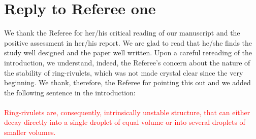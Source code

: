 \documentclass[12pt,english]{article}
\begin{document}

\section*{Reply to Referee one}

We thank the Referee for her/his critical reading of our manuscript and the positive assessment in her/his report.
We are glad to read that he/she finds the study well designed and the paper well written. Upon a careful rereading of the introduction, we understand, indeed, the Referee's concern about the nature of the stability of ring-rivulets, which was not made crystal clear since 
the very beginning. We thank, therefore, the Referee for pointing this 
out and we added the following sentence in the introduction:\\
\\
\textcolor{red}{Ring-rivulets are, consequently, intrinsically unstable structure, that can either decay directly into a single droplet of equal volume or into several droplets of smaller volumes.}


% 
% 
\end{document}
